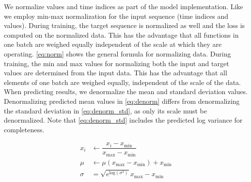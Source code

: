 We normalize values and time indices as part of the model implementation. Like \citet{seifner2025zeroshotimputationfoundationinference} we employ min-max normalization for the input sequence (time indices and values). During training, the target sequence is normalized as well and the loss is computed on the normalized data. This has the advantage that all functions in one batch are weighed equally independent of the scale at which they are operating. \autoref{eq:norm} shows the general formula for normalizing data. During training, the min and max values for normalizing both the input and target values are determined from the input data. This has the advantage that all elements of one batch are weighed equally, independent of the scale of the data. When predicting results, we denormalize the mean and standard deviation values. Denormalizing predicted mean values in \autoref{eq:denorm} differs from denormalizing the standard deviation in \autoref{eq:denorm_std}, as only its scale must be denormalized. Note that \autoref{eq:denorm_std} includes the predicted log variance for completeness.

\begin{align}
x_i &\leftarrow \dfrac{x_i-x_{\text{min}}}{x_{\text{max}}-x_{\text{min}}} \label{eq:norm} \\
\mu &\leftarrow \mu (x_{\text{max}}-x_{\text{min}}) + x_{\text{min}} \label{eq:denorm} \\
\sigma &= \sqrt{e^{\text{log}(\sigma^2)}} x_{\text{max}}-x_{\text{min}} \label{eq:denorm_std} 
\end{align}



